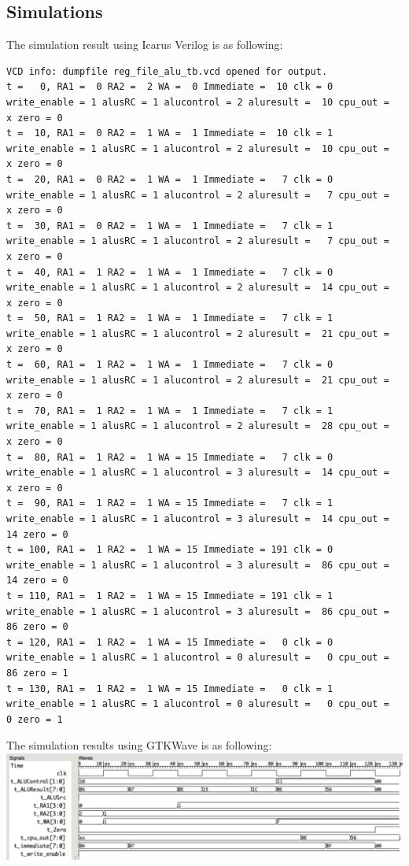 \documentclass{article}
\begin{document}
\subsection{Simulations}
The simulation result using Icarus Verilog is as following:
\begin{Verbatim}[fontsize = \scriptsize]
VCD info: dumpfile reg_file_alu_tb.vcd opened for output.
t =   0, RA1 =  0 RA2 =  2 WA =  0 Immediate =  10 clk = 0 write_enable = 1 alusRC = 1 alucontrol = 2 aluresult =  10 cpu_out =   x zero = 0
t =  10, RA1 =  0 RA2 =  1 WA =  1 Immediate =  10 clk = 1 write_enable = 1 alusRC = 1 alucontrol = 2 aluresult =  10 cpu_out =   x zero = 0
t =  20, RA1 =  0 RA2 =  1 WA =  1 Immediate =   7 clk = 0 write_enable = 1 alusRC = 1 alucontrol = 2 aluresult =   7 cpu_out =   x zero = 0
t =  30, RA1 =  0 RA2 =  1 WA =  1 Immediate =   7 clk = 1 write_enable = 1 alusRC = 1 alucontrol = 2 aluresult =   7 cpu_out =   x zero = 0
t =  40, RA1 =  1 RA2 =  1 WA =  1 Immediate =   7 clk = 0 write_enable = 1 alusRC = 1 alucontrol = 2 aluresult =  14 cpu_out =   x zero = 0
t =  50, RA1 =  1 RA2 =  1 WA =  1 Immediate =   7 clk = 1 write_enable = 1 alusRC = 1 alucontrol = 2 aluresult =  21 cpu_out =   x zero = 0
t =  60, RA1 =  1 RA2 =  1 WA =  1 Immediate =   7 clk = 0 write_enable = 1 alusRC = 1 alucontrol = 2 aluresult =  21 cpu_out =   x zero = 0
t =  70, RA1 =  1 RA2 =  1 WA =  1 Immediate =   7 clk = 1 write_enable = 1 alusRC = 1 alucontrol = 2 aluresult =  28 cpu_out =   x zero = 0
t =  80, RA1 =  1 RA2 =  1 WA = 15 Immediate =   7 clk = 0 write_enable = 1 alusRC = 1 alucontrol = 3 aluresult =  14 cpu_out =   x zero = 0
t =  90, RA1 =  1 RA2 =  1 WA = 15 Immediate =   7 clk = 1 write_enable = 1 alusRC = 1 alucontrol = 3 aluresult =  14 cpu_out =  14 zero = 0
t = 100, RA1 =  1 RA2 =  1 WA = 15 Immediate = 191 clk = 0 write_enable = 1 alusRC = 1 alucontrol = 3 aluresult =  86 cpu_out =  14 zero = 0
t = 110, RA1 =  1 RA2 =  1 WA = 15 Immediate = 191 clk = 1 write_enable = 1 alusRC = 1 alucontrol = 3 aluresult =  86 cpu_out =  86 zero = 0
t = 120, RA1 =  1 RA2 =  1 WA = 15 Immediate =   0 clk = 0 write_enable = 1 alusRC = 1 alucontrol = 0 aluresult =   0 cpu_out =  86 zero = 1
t = 130, RA1 =  1 RA2 =  1 WA = 15 Immediate =   0 clk = 1 write_enable = 1 alusRC = 1 alucontrol = 0 aluresult =   0 cpu_out =   0 zero = 1
\end{Verbatim}
The simulation results using GTKWave is as following:\vspace{5pt}\\
\includegraphics[width=\textwidth]{reg_file_alu.png}
\end{document}
